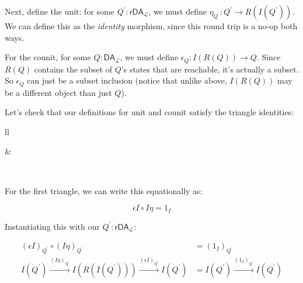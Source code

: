 \documentclass{article}
\theoremstyle{plain}
\theoremstyle{definition}
\begin{document}
Next, define the unit: for some \ensuremath{{Q}^{'} : {\mathsf{rDA}}_{\mathcal{L}}}, we must define \ensuremath{{\eta }_{{Q}^{'}} : {Q}^{'} \rightarrow R\left( I\left( {Q}^{'} \right) \right)}. We can define this as the \emph{identity} morphism, since this round trip is a no-op both ways.

For the counit, for some \ensuremath{Q : {\mathsf{DA}}_{\mathcal{L}}}, we must define \ensuremath{{\epsilon }_{Q} : I\left( R\left( Q \right) \right) \rightarrow Q}. Since \ensuremath{R\left( Q \right)} contains the subset of \ensuremath{Q}'s states that are reachable, it's actually a subset. So \ensuremath{{\epsilon }_{Q}} can just be a subset inclusion (notice that unlike above, \ensuremath{I\left( R\left( Q \right) \right)} may be a different object than just \ensuremath{Q}).

Let's check that our definitions for unit and counit satisfy the triangle identities:

\begin{tabular}{ll}
\hline

 & 
 \\
\hline
\end{tabular}


For the first triangle, we can write this equationally as:

\[
\epsilon I \circ I \eta = {1}_{I}
\]

Instantiating this with our \ensuremath{{Q}^{'} : {\mathsf{rDA}}_{\mathcal{L}}}:

\[
\begin{aligned}
{\left( \epsilon I \right)}_{{Q}^{'}} \circ {\left( I \eta \right)}_{{Q}^{'}} & = {\left( {1}_{I} \right)}_{{Q}^{'}} \\ I\left( {Q}^{'} \right) \xrightarrow{{\left( I \eta \right)}_{{Q}^{'}}} I\left( R\left( I\left( {Q}^{'} \right) \right) \right) \xrightarrow{{\left( \epsilon I \right)}_{{Q}^{'}}} I\left( {Q}^{'} \right) & = I\left( {Q}^{'} \right) \xrightarrow{{\left( {1}_{I} \right)}_{{Q}^{'}}} I\left( {Q}^{'} \right)
\end{aligned}
\]
\end{document}
